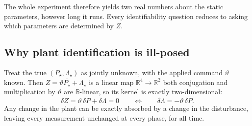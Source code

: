 \documentclass[11pt]{article}
\begin{document}
The whole experiment therefore yields two real numbers about the static parameters, however long it runs.
%
Every identifiability question reduces to asking which parameters are determined by $Z$.

\subsection{Why plant identification is ill-posed}
\label{sec:illposed}

Treat the true $(P_\star,\Lambda_\star)$ as jointly unknown, with the applied command $\vartheta$ known. 
%
Then $Z=\vartheta\overline{P_\star}+\Lambda_\star$ is a {linear} map $\mathbb{R}^4\to\mathbb{R}^2$ both conjugation and multiplication by $\vartheta$ are $\mathbb{R}$-linear, so its kernel is exactly two-dimensional:
%
\begin{equation}
  \delta Z=\vartheta\,\overline{\delta P}+\delta\Lambda=0
  \qquad\Longleftrightarrow\qquad
  \delta\Lambda=-\vartheta\,\overline{\delta P} .
  \label{eq:kernel}
\end{equation}
%
Any change in the plant can be exactly absorbed by a change in the disturbance, leaving every measurement unchanged at every phase, for all time.
%
%
%
\end{document}
